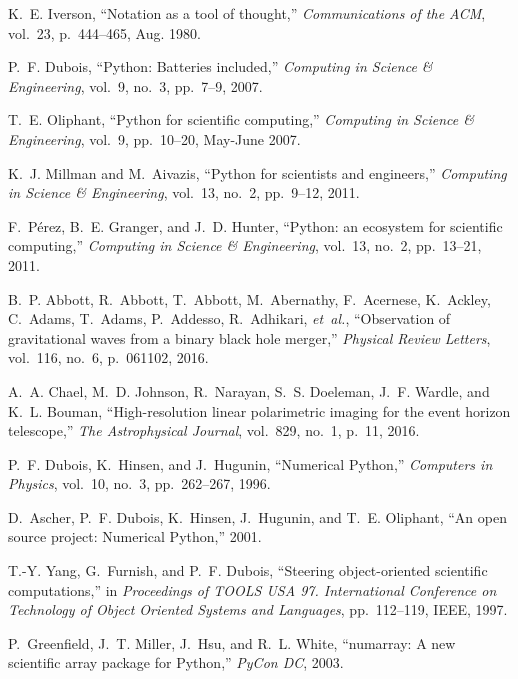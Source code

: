 \documentclass[twocolumn]{article}
\begin{document}
\begin{thebibliography}{10}

K.~E. Iverson, ``Notation as a tool of thought,'' {\em Communications of the
  ACM}, vol.~23, p.~444–465, Aug. 1980.

P.~F. Dubois, ``{P}ython: Batteries included,'' {\em Computing in Science \&
  Engineering}, vol.~9, no.~3, pp.~7--9, 2007.

T.~E. Oliphant, ``{P}ython for scientific computing,'' {\em Computing in
  Science \& Engineering}, vol.~9, pp.~10--20, May-June 2007.

K.~J. Millman and M.~Aivazis, ``{P}ython for scientists and engineers,'' {\em
  Computing in Science \& Engineering}, vol.~13, no.~2, pp.~9--12, 2011.

F.~P\'{e}rez, B.~E. Granger, and J.~D. Hunter, ``{P}ython: an ecosystem for
  scientific computing,'' {\em Computing in Science \& Engineering}, vol.~13,
  no.~2, pp.~13--21, 2011.

B.~P. Abbott, R.~Abbott, T.~Abbott, M.~Abernathy, F.~Acernese, K.~Ackley,
  C.~Adams, T.~Adams, P.~Addesso, R.~Adhikari, {\em et~al.}, ``Observation of
  gravitational waves from a binary black hole merger,'' {\em Physical Review
  Letters}, vol.~116, no.~6, p.~061102, 2016.

A.~A. Chael, M.~D. Johnson, R.~Narayan, S.~S. Doeleman, J.~F. Wardle, and K.~L.
  Bouman, ``High-resolution linear polarimetric imaging for the event horizon
  telescope,'' {\em The Astrophysical Journal}, vol.~829, no.~1, p.~11, 2016.

P.~F. Dubois, K.~Hinsen, and J.~Hugunin, ``Numerical {P}ython,'' {\em Computers
  in Physics}, vol.~10, no.~3, pp.~262--267, 1996.

D.~Ascher, P.~F. Dubois, K.~Hinsen, J.~Hugunin, and T.~E. Oliphant, ``An open
  source project: Numerical {P}ython,'' 2001.

T.-Y. Yang, G.~Furnish, and P.~F. Dubois, ``Steering object-oriented scientific
  computations,'' in {\em Proceedings of TOOLS USA 97. International Conference
  on Technology of Object Oriented Systems and Languages}, pp.~112--119, IEEE,
  1997.

P.~Greenfield, J.~T. Miller, J.~Hsu, and R.~L. White, ``numarray: A new
  scientific array package for {Python},'' {\em PyCon DC}, 2003.


\end{thebibliography}
\end{document}
